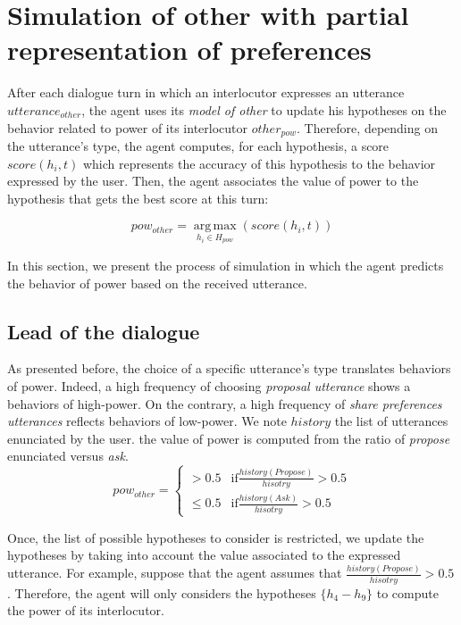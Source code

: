 \documentclass[conference, letterpaper]{IEEEtran}
\begin{document}
	\section{Simulation of other with partial representation of preferences}
	\label{sec:simulation}
		After each dialogue turn in which an interlocutor expresses an utterance $utterance_{other}$, the agent uses its \emph{model of other} to update his hypotheses on the behavior related to power of its interlocutor $other_{pow}$. 
		Therefore, depending on the utterance's type, the agent computes, for each hypothesis, a score $score(h_i,t)$ which represents the accuracy of this hypothesis to the behavior expressed by the user. Then, the agent associates the value of power to the hypothesis that gets the best score at this turn:
			
			\begin{equation}
			pow_{other} = \operatorname*{arg\,max}_{h_i \in H_{pow}} (score(h_i,t))
			\end{equation}
		
	In this section, we present the process of simulation in which the agent predicts the behavior of power based on the received utterance. 
		
		\subsection{Lead of the dialogue}		
		As presented before, the choice of a specific utterance's type translates behaviors of power. Indeed, a high frequency of choosing \emph{proposal utterance} shows a behaviors of high-power. On the contrary, a high frequency of \emph{share preferences utterances} reflects behaviors of low-power.
		We note $history$ the list of utterances enunciated by the user. the value of power is computed from the ratio of \textit{propose} enunciated versus \textit{ask}.
		\begin{equation}
		pow_{other} = \left\{\begin{array}{ll}
		> 0.5 & \mathrm{if } \frac{history(Propose)}{hisotry} > 0.5\\
		\leq 0.5 & \mathrm{if  } \frac{history(Ask)}{hisotry} > 0.5
		\end{array}\right.
		\end{equation}
		
		Once, the list of possible hypotheses to consider is restricted, we update the hypotheses by taking into account the value associated to the expressed utterance.
		For example, suppose that the agent assumes that $\frac{history(Propose)}{hisotry} > 0.5$. Therefore, the agent will only considers the hypotheses $\{h_4 - h_9\}$ to compute the power of its interlocutor.
		
\end{document}
